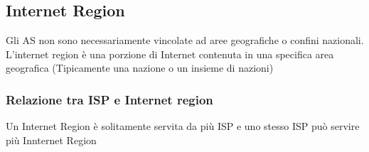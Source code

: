 \documentclass{report}
\begin{document}
                \subsection{Internet Region}
                    Gli AS non sono necessariamente vincolate ad aree geografiche o confini nazionali.
                    \\
                    L'internet region è una porzione di Internet contenuta in una specifica area geografica (Tipicamente una nazione o un insieme di nazioni)
                    \\
                    \subsubsection{Relazione tra ISP e Internet region}
                        Un Internet Region è solitamente servita da più ISP e uno stesso ISP può servire più Innternet Region
\end{document}

